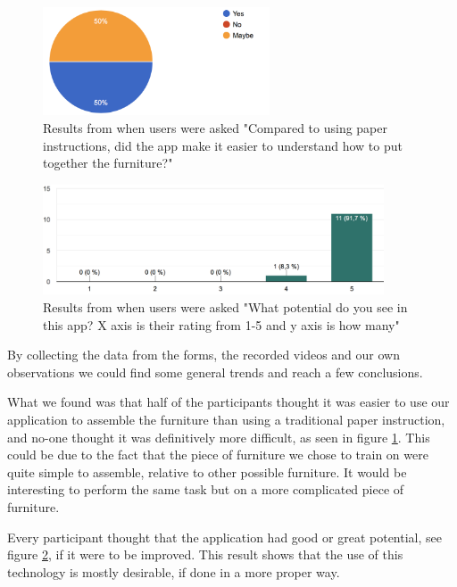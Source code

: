 \begin{figure}[hbtp]
\begin{center}
\includegraphics[width = 0.6\textwidth]{./Images/comparedTo.png}
\caption{Results from when users were asked "Compared to using paper instructions, did the app make it easier to understand how to put together the furniture?"}
\label{fig:question5}
\end{center}
\end{figure}

\begin{figure}[hbtp]
\begin{center}
\includegraphics[width = 0.9\textwidth]{./Images/potential.png}
\caption{Results from when users were asked "What potential do you see in this app? X axis is their rating from 1-5 and y axis is how many"}
\label{fig:question6}
\end{center}
\end{figure}


By collecting the data from the forms, the recorded videos and our own observations we could find some general trends and reach a few conclusions.

What we found was that half of the participants thought it was easier to use our
application to assemble the furniture than using a traditional paper instruction, and no-one
thought it was definitively more difficult, as seen in figure \ref{fig:question5}. This could be due to the fact that the piece of furniture we 
chose to train on were quite simple to assemble, relative to other possible furniture. It would be interesting to perform the same task but on a more complicated piece of furniture.

Every participant thought that the application had good or great potential, see figure \ref{fig:question6}, if it were 
to be improved. This result shows that the use of this technology is mostly desirable, if 
done in a more proper way.

